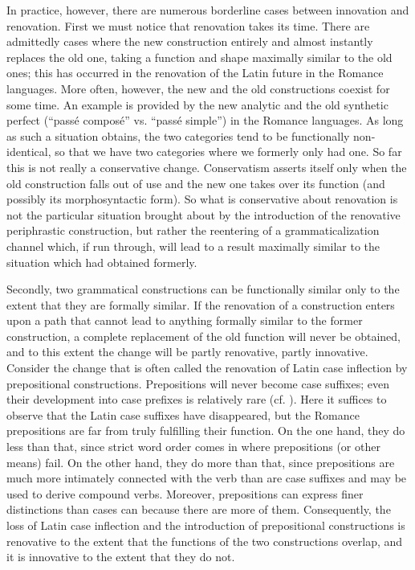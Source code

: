 In practice, however, there are numerous borderline cases between innovation and renovation. First we must notice that renovation takes its time. There are admittedly cases where the new construction entirely and almost instantly replaces the old one, taking a function and shape maximally similar to the old ones; this has occurred in the renovation of the Latin future in the Romance languages. More often, however, the new and the old constructions coexist for some time. An example is provided by the new analytic and the old synthetic perfect (``passé composé'' vs. ``passé simple'') in the Romance languages. As long as such a situation obtains, the two categories tend to be functionally non-identical, so that we have two categories where we formerly only had one. So far this is not really a conservative change. Conservatism asserts itself only when the old construction falls out of use and the new one takes over its function (and possibly its morphosyntactic form). So what is conservative about renovation is not the particular situation brought about by the introduction of the renovative periphrastic construction, but rather the reentering of a grammaticalization channel which, if run through, will lead to a result maximally similar to the situation which had obtained formerly.

Secondly, two grammatical constructions can be functionally similar only to the extent that they are formally similar. If the renovation of a construction enters upon a path that cannot lead to anything formally similar to the former construction, a complete replacement of the old function will never be obtained, and to this extent the change will be partly renovative, partly innovative. Consider the change that is often called the renovation of Latin case inflection by prepositional constructions. Prepositions will never become case suffixes; even their development into case prefixes is relatively rare (cf. ). Here it suffices to observe that the Latin case suffixes have disappeared, but the Romance prepositions are far from truly fulfilling their function. On the one hand, they do less than that, since strict word order comes in where prepositions (or other means) fail. On the other hand, they do more than that, since prepositions are much more intimately connected with the verb than are case suffixes and may be used to derive compound verbs. Moreover, prepositions can express finer distinctions than cases can because there are more of them. Consequently, the loss of Latin case inflection and the introduction of prepositional constructions is renovative to the extent that the functions of the two constructions overlap, and it is innovative to the extent that they do not.

